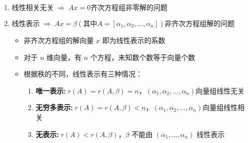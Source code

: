 \documentclass[a4paper,12pt]{article}
\begin{document}
    \begin{enumerate}
        \item $\text{线性相关无关} \;\Rightarrow\; Ax = 0\text{齐次方程组非零解的问题}$
        \item $\text{线性表示} \;\Rightarrow\; Ax = \beta(\text{其中}A = [\alpha_1, \alpha_2, \dots, \alpha_n])\text{非齐次方程组解的问题}$
        \begin{itemize}
            \item 非齐次方程组的解向量 $x$ 即为线性表示的系数
            \item 对于 $n$ 维向量，有 $n$ 个方程，未知数个数等于向量个数
            \item 根据秩的不同，线性表示有三种情况：
            \begin{enumerate}
                \item \textbf{唯一表示:}$\; r(A) = r(A,\beta) = n$，$(\alpha_1, \alpha_2, \dots, \alpha_n)$向量组线性无关
                \item \textbf{无穷多表示:}$\; r(A) = r(A,\beta) < n$，$(\alpha_1, \alpha_2, \dots, \alpha_n)$向量组线性相关
                \item \textbf{无表示:}$\; r(A) < r(A,\beta)$，$\beta$ 不能由 $(\alpha_1,\dots,\alpha_n)$ 线性表示
            \end{enumerate}
        \end{itemize}
    \end{enumerate}
\end{document}
